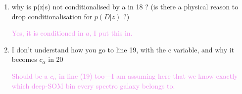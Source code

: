 \documentclass[11pt,preprint,flushrt]{aastex631}
\newcommand\answer[1]{\textcolor{violet}{#1}}
\begin{document}
\begin{enumerate}
\item why is p(z|s) not conditionalised by a in 18 ? (is there a physical
  reason to drop conditionalisation for $p(D|z)$ ?)

  \answer{Yes, it is conditioned in $a$, I put this in.}

\item I don't understand how you go to line 19, with the c variable,
  and why it becomes $c_\alpha$ in 20

  \answer{Should be a $c_\alpha$ in line (19) too---I am assuming here
    that we know exactly which deep-SOM bin every spectro galaxy
    belongs to.}
  
\end{enumerate}
\end{document}
